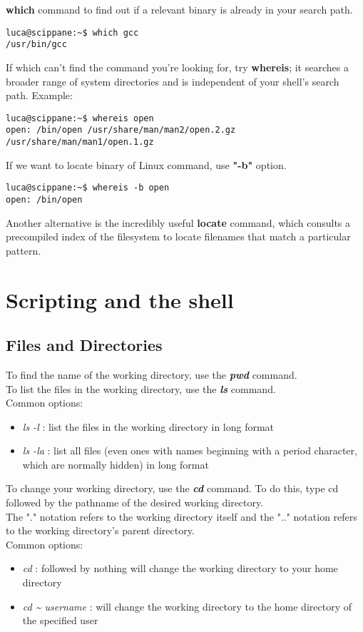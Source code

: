 \documentclass[10pt,letterpaper]{book}
\begin{document}
\textbf{which} command to find out if a relevant binary is already in your search path.
\begin{lstlisting}
luca@scippane:~$ which gcc
/usr/bin/gcc
\end{lstlisting}
If which can't find the command you're looking for, try \textbf{whereis}; it searches a broader range of system directories and is independent of your shell's search path. Example: \\
\begin{lstlisting}
luca@scippane:~$ whereis open
open: /bin/open /usr/share/man/man2/open.2.gz /usr/share/man/man1/open.1.gz
\end{lstlisting}
If we want to locate binary of Linux command, use \textbf{"-b"} option.\\
\begin{lstlisting}
luca@scippane:~$ whereis -b open
open: /bin/open
\end{lstlisting}
Another alternative is the incredibly useful \textbf{locate} command, which consults a precompiled index of the filesystem to locate filenames that match a particular
pattern.
\section{Scripting and the shell}
\subsection{Files and Directories}
To find the name of the working directory, use the \textit{\textbf{pwd}} command.\\
To list the files in the working directory, use the \textit{\textbf{ls}} command.\\
Common options:
\begin{itemize}
\item \textit{ls -l} : list the files in the working directory in long format
\item \textit{ls -la} : list all files (even ones with names beginning with a period character, which are normally hidden) in long format
\end{itemize}
To change your working directory, use the \textit{\textbf{cd}} command. To do this, type cd followed by the pathname of the desired working directory.\\
The "." notation refers to the working directory itself and the ".." notation refers to the working directory's parent directory.\\
Common options:
\begin{itemize}
\item \textit{cd} : followed by nothing will change the working directory to your home directory
\item \textit{cd \~{} username} : will change the working directory to the home directory of the specified user
\end{itemize}
\end{document}
